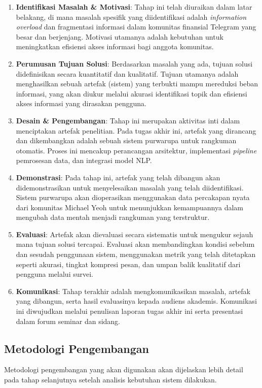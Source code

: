 \begin{enumerate}
\item \textbf{Identifikasi Masalah \& Motivasi}: Tahap ini telah diuraikan dalam latar belakang, di mana masalah spesifik yang diidentifikasi adalah \textit{information overload} dan fragmentasi informasi dalam komunitas finansial Telegram yang besar dan berjenjang. Motivasi utamanya adalah kebutuhan untuk meningkatkan efisiensi akses informasi bagi anggota komunitas.

\item \textbf{Perumusan Tujuan Solusi}: Berdasarkan masalah yang ada, tujuan solusi didefinisikan secara kuantitatif dan kualitatif. Tujuan utamanya adalah menghasilkan sebuah artefak (sistem) yang terbukti mampu mereduksi beban informasi, yang akan diukur melalui akurasi identifikasi topik dan efisiensi akses informasi yang dirasakan pengguna.

\item \textbf{Desain \& Pengembangan}: Tahap ini merupakan aktivitas inti dalam menciptakan artefak penelitian. Pada tugas akhir ini, artefak yang dirancang dan dikembangkan adalah sebuah sistem purwarupa untuk rangkuman otomatis. Proses ini mencakup perancangan arsitektur, implementasi \textit{pipeline} pemrosesan data, dan integrasi model NLP.

\item \textbf{Demonstrasi}: Pada tahap ini, artefak yang telah dibangun akan didemonstrasikan untuk menyelesaikan masalah yang telah diidentifikasi. Sistem purwarupa akan dioperasikan menggunakan data percakapan nyata dari komunitas Michael Yeoh untuk menunjukkan kemampuannya dalam mengubah data mentah menjadi rangkuman yang terstruktur.

\item \textbf{Evaluasi}: Artefak akan dievaluasi secara sistematis untuk mengukur sejauh mana tujuan solusi tercapai. Evaluasi akan membandingkan kondisi sebelum dan sesudah penggunaan sistem, menggunakan metrik yang telah ditetapkan seperti akurasi, tingkat kompresi pesan, dan umpan balik kualitatif dari pengguna melalui survei.

\item \textbf{Komunikasi}: Tahap terakhir adalah mengkomunikasikan masalah, artefak yang dibangun, serta hasil evaluasinya kepada audiens akademis. Komunikasi ini diwujudkan melalui penulisan laporan tugas akhir ini serta presentasi dalam forum seminar dan sidang.
\end{enumerate}

\subsection{Metodologi Pengembangan}
Metodologi pengembangan yang akan digunakan akan dijelaskan lebih detail pada tahap selanjutnya setelah analisis kebutuhan sistem dilakukan.
